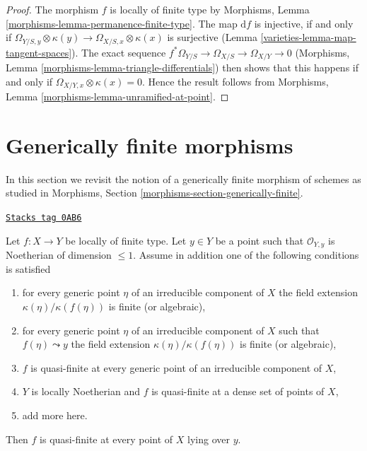 \begin{proof}

The morphism $f$ is locally of finite type by
Morphisms, Lemma \ref{morphisms-lemma-permanence-finite-type}.
The map $\text{d}f$ is injective, if and only if
$\Omega_{Y/S, y} \otimes \kappa(y) \to \Omega_{X/S, x} \otimes \kappa(x)$
is surjective (Lemma \ref{varieties-lemma-map-tangent-spaces}).
The exact sequence $f^*\Omega_{Y/S} \to \Omega_{X/S} \to \Omega_{X/Y} \to 0$
(Morphisms, Lemma \ref{morphisms-lemma-triangle-differentials})
then shows that this happens if and only if
$\Omega_{X/Y, x} \otimes \kappa(x) = 0$.
Hence the result follows from
Morphisms, Lemma \ref{morphisms-lemma-unramified-at-point}.
\end{proof}

\section{Generically finite morphisms}
\label{varieties-section-generically-finite}
In this section we revisit the notion of a generically finite
morphism of schemes as studied in
Morphisms, Section \ref{morphisms-section-generically-finite}.

\begin{lemma}
\label{varieties-lemma-quasi-finite-in-codim-1}
\href{https://stacks.math.columbia.edu/tag/0AB6}{\texttt{Stacks tag 0AB6}}

Let $f : X \to Y$ be locally of finite type. Let $y \in Y$ be a point
such that $\mathcal{O}_{Y, y}$ is Noetherian of dimension $\leq 1$.
Assume in addition one of the following conditions is satisfied
\begin{enumerate}
\item for every generic point $\eta$ of an irreducible component
of $X$ the field extension $\kappa(\eta)/\kappa(f(\eta))$
is finite (or algebraic),
\item for every generic point $\eta$ of an irreducible component
of $X$ such that $f(\eta) \leadsto y$ the field extension
$\kappa(\eta)/\kappa(f(\eta))$ is finite (or algebraic),
\item $f$ is quasi-finite at every generic point of an
irreducible component of $X$,
\item $Y$ is locally Noetherian and $f$
is quasi-finite at a dense set of points of $X$,
\item add more here.
\end{enumerate}
Then $f$ is quasi-finite at every point of $X$ lying over $y$.
\end{lemma}


